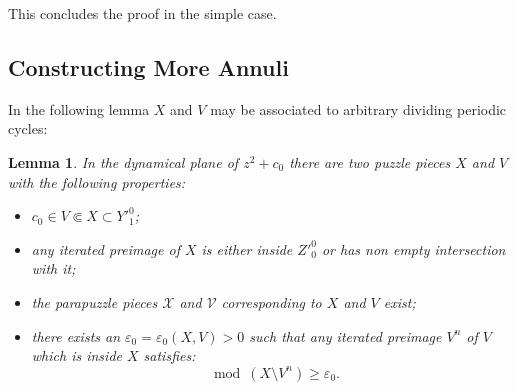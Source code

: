 \documentclass[12pt,a4paper]{amsart}
\newtheorem{lemma}[theorem]{Lemma}
\newcommand{\VV}{\mathcal V}
\newcommand{\XX}{\mathcal X}
\newcommand{\sm}{\setminus}
\begin{document}
This concludes the proof in the simple case.

  \subsection{Constructing More Annuli}

\label{sec2.4}

In the following lemma $X$ and $V$ may be associated to arbitrary
dividing periodic cycles:

\begin{lemma}
\label{lem4} In the dynamical plane of $z^{2}+c_{0}$ there are two
puzzle pieces $X$ and $V$ with the following properties:
\begin{itemize}
\item  $c_{0}\in V\Subset X\subset Y'^{0}_{1}$;
\item any iterated preimage of $X$ is either inside ${Z'^0_0}$
or has non empty intersection with it;

\item the parapuzzle pieces $\XX$ and $\VV$ corresponding to $X$ and $V$ exist;
\item there exists an $\varepsilon_{0}=\varepsilon_{0}(X,V)>0$ such that
any iterated preimage $V^{n}$ of $V$ which is inside $X$ satisfies:
\[
\mod(X\sm V^{n})\ge \varepsilon_{0}.
\]

\end{itemize}
\end{lemma}
\end{document}
